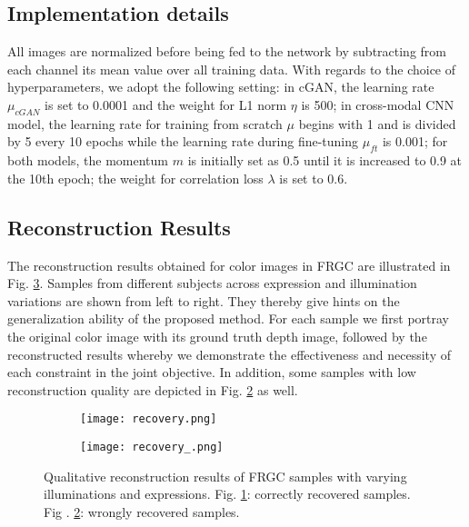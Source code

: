 \documentclass{bmvc2k}
\begin{document}

\subsection{Implementation details} 

All images are normalized before being fed to the network by subtracting from each channel its mean value over all training data. With regards to the choice of hyperparameters, we adopt the following setting: in cGAN, the learning rate $\mu_{cGAN}$ is set to 0.0001 and the weight for L1 norm $\eta$ is 500; in cross-modal CNN model, the learning rate for training from scratch $\mu$ begins with 1 and is divided by 5 every 10 epochs while the learning rate during fine-tuning $\mu_{ft}$ is 0.001; for both models, the momentum $m$ is initially set as 0.5 until it is increased to 0.9 at the 10th epoch; the weight for correlation loss $\lambda$ is set to 0.6.

\subsection{Reconstruction Results}

The reconstruction results obtained for color images in FRGC are illustrated in Fig. \ref{recovery}. Samples from different subjects across expression and illumination variations are shown from left to right. They thereby give hints on the generalization ability of the proposed method. For each sample we first portray the original color image with its ground truth depth image, followed by the reconstructed results whereby we demonstrate the effectiveness and necessity of each constraint in the joint objective. In addition, some samples with low reconstruction quality are depicted in Fig. \ref{recovery_bad} as well.

\begin{figure}
\centering
\begin{subfigure}{.75\textwidth}
\centering
\texttt{[image: recovery.png]}
\caption{}
\label{recovery_good}
\end{subfigure}%
\begin{subfigure}{.25\textwidth}
\centering
\texttt{[image: recovery\_.png]}
\caption{}
\label{recovery_bad}
\end{subfigure}
\caption{Qualitative reconstruction results of FRGC samples with varying illuminations and expressions. Fig. \ref{recovery_good}: correctly recovered samples. Fig . \ref{recovery_bad}: wrongly recovered samples.}
\label{recovery}
\end{figure}
\end{document}
